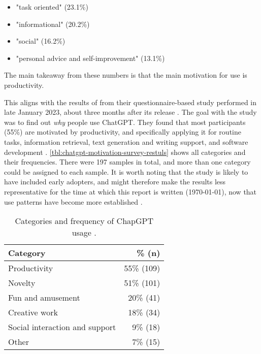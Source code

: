 \begin{itemize}
    \item "task oriented" (23.1\%)
    \item "informational" (20.2\%)
    \item "social"  (16.2\%)
    \item "personal advice and self-improvement" (13.1\%)
\end{itemize}

The main takeaway from these numbers is that the main motivation for use is productivity.

This aligns with the results of \cite*{skjuveWhyPeopleUse2023} from their questionnaire-based study performed in late January 2023, about three months after its release \citep{openaiGPT4TechnicalReport2023}. The goal with the study was to find out \textit{why} people use ChatGPT. They found that most participants (55\%) are motivated by productivity, and specifically applying it for routine tasks, information retrieval, text generation and writing support, and software development \citep[17-21]{skjuveWhyPeopleUse2023}. \autoref{tbl:chatgpt-motivation-survey-restuls} shows all categories and their frequencies. There were 197 samples in total, and more than one category could be  assigned to each sample. It is worth noting that the study is likely to have included early adopters, and might therefore make the results less representative for the time at which this report is written (\today), now that use patterns have become more established \citep[37]{skjuveWhyPeopleUse2023}.

\begin{table}[ht]
    \centering
    \caption{Categories and frequency of ChapGPT usage \citep[16-17]{skjuveWhyPeopleUse2023}.}
    \label{tbl:chatgpt-motivation-survey-restuls}
    \begin{tabular}[t]{lr}
        \toprule
        \textbf{Category}              & \% \textbf{(n)} \\
        \midrule
        Productivity                   & 55\% (109)      \\
        Novelty                        & 51\% (101)      \\
        Fun and amusement              & 20\% (41)       \\
        Creative work                  & 18\% (34)       \\
        Social interaction and support & 9\% (18)        \\
        Other                          & 7\% (15)        \\
        \bottomrule
    \end{tabular}
\end{table}

